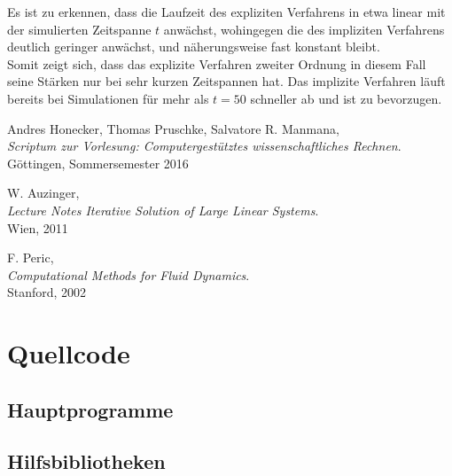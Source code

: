 \documentclass[12pt,a4paper,titlepage,headinclude,bibtotoc]{scrartcl}
\begin{document}
Es ist zu erkennen, dass die Laufzeit des expliziten Verfahrens in etwa linear mit der simulierten Zeitspanne $t$ anwächst, wohingegen die des impliziten Verfahrens deutlich geringer anwächst, und näherungsweise fast konstant bleibt.\\
Somit zeigt sich, dass das explizite Verfahren zweiter Ordnung in diesem Fall seine Stärken nur bei sehr kurzen Zeitspannen hat. Das implizite Verfahren läuft bereits bei Simulationen für mehr als $t=50$ schneller ab und ist zu bevorzugen.
\begin{thebibliography}{9}
  Andres Honecker, Thomas Pruschke, Salvatore R. Manmana, \\
  \emph{Scriptum zur Vorlesung: Computergestütztes wissenschaftliches Rechnen}. \\
 Göttingen,
  Sommersemester 2016

  W. Auzinger, \\
  \emph{Lecture Notes Iterative Solution of Large Linear Systems}. \\
 Wien, 2011
 
  F. Peric, \\
  \emph{Computational Methods for Fluid Dynamics}. \\
 Stanford, 2002
 
 
 
 \end{thebibliography}
\clearpage

\clearpage

\appendix
\section{Quellcode}
\subsection{Hauptprogramme}
\label{sec:source_main} 



\clearpage

\subsection{Hilfsbibliotheken}
\label{sec:source_lib} 






\end{document}
